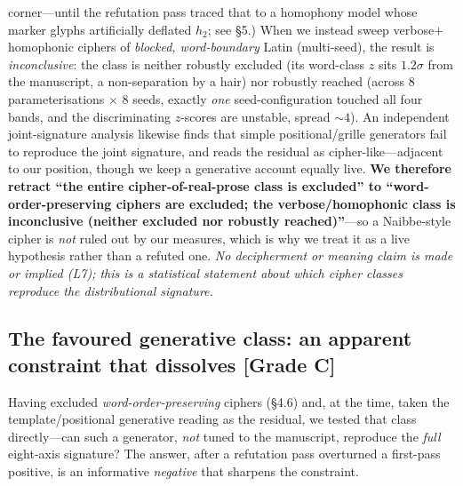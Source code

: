 \documentclass[11pt]{article}
\newcommand{\grade}[1]{{\small\textbf{[#1]}}}
\begin{document}
corner---until the refutation pass traced that to a homophony model whose marker glyphs
artificially deflated $h_2$; see \S5.) When we instead
sweep verbose$+$homophonic ciphers of \emph{blocked, word-boundary} Latin (multi-seed), the
result is \emph{inconclusive}: the class is neither robustly excluded (its word-class $z$ sits
$1.2\sigma$ from the manuscript, a non-separation by a hair) nor robustly reached (across
$8$ parameterisations $\times$ $8$ seeds, exactly \emph{one} seed-configuration touched all
four bands, and the discriminating $z$-scores are unstable, spread $\sim\!4$). An independent
joint-signature analysis \citep{parisel2026layered} likewise finds that simple positional/grille
generators fail to reproduce the joint signature, and reads the residual as cipher-like---adjacent
to our position, though we keep a generative account equally live.
\textbf{We therefore retract ``the entire cipher-of-real-prose class is excluded'' to
``word-order-preserving ciphers are excluded; the verbose/homophonic class is inconclusive
(neither excluded nor robustly reached)''}---so a Naibbe-style cipher is \emph{not} ruled out
by our measures, which is why we treat it as a live hypothesis rather than a refuted one.
\emph{No decipherment or meaning claim is made
or implied (L7); this is a statistical statement about which cipher classes reproduce the
distributional signature.}

\subsection{The favoured generative class: an apparent constraint that dissolves \grade{Grade C}}
Having excluded \emph{word-order-preserving} ciphers (\S4.6) and, at the time, taken the
template/positional generative reading as the residual, we tested that class
directly---can such a generator, \emph{not}
tuned to the manuscript, reproduce the \emph{full} eight-axis signature? The answer,
after a refutation pass overturned a first-pass positive, is an informative
\emph{negative} that sharpens the constraint.
\end{document}
